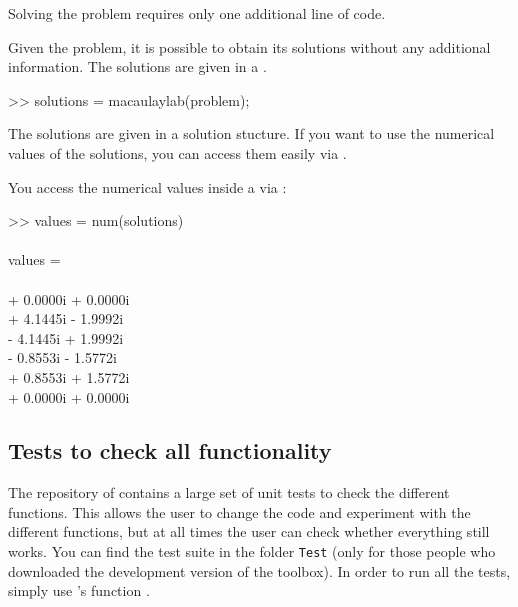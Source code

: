 \documentclass{manual}
\begin{document}
            Solving the problem requires only one additional line of code.
            \begin{code}
                Given the problem, it is possible to obtain its solutions without any additional information. 
                The solutions are given in a .
                \begin{codeblock}
                    >> solutions = macaulaylab(problem);
                \end{codeblock}
            \end{code}
            The solutions are given in a solution stucture. 
            If you want to use the numerical values of the solutions, you can access them easily via .
            \begin{code}
                You access the numerical values inside a  via :
                \begin{codeblock}
                    >> values = num(solutions) \\ \phantom{-} \\
                    values = \\ \phantom{-} \\
                     + 0.0000i  + 0.0000i \\
                     + 4.1445i  - 1.9992i \\
                     - 4.1445i  + 1.9992i \\
                     - 0.8553i  - 1.5772i \\
                     + 0.8553i  + 1.5772i \\
                     + 0.0000i  + 0.0000i 
                \end{codeblock}
            \end{code}

        \subsection{Tests to check all functionality}

            The repository of \maclab\space contains a large set of unit tests to check the different functions. 
            This allows the user to change the code and experiment with the different functions, but at all times the user can check whether everything still works. 
            You can find the test suite in the folder \texttt{\color{string}Test} (only for those people who downloaded the development version of the toolbox).
            In order to run all the tests, simply use \matlab's function .
\end{document}
